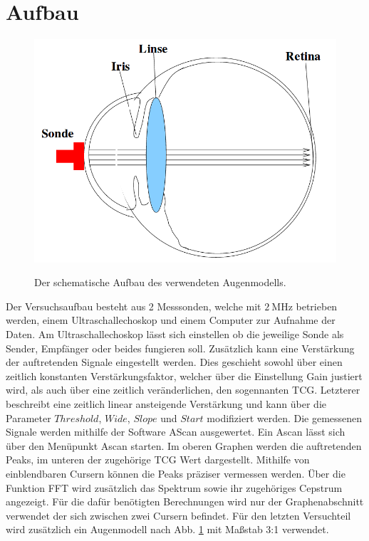 \section{Aufbau}
\label{sec:Aufbau}

\begin{figure}
 \centering
 \caption{Der schematische Aufbau des verwendeten Augenmodells.\cite{US1}}
 \includegraphics[width=\linewidth-170pt,height=\textheight-170pt,keepaspectratio]{content/AUGE.png}
 \label{fig:auge}
\end{figure}

Der Versuchsaufbau besteht aus 2 Messsonden, welche mit $\SI{2}{\mega\hertz}$
betrieben werden, einem Ultraschallechoskop und einem Computer zur Aufnahme der Daten.
Am Ultraschallechoskop lässt sich einstellen ob die jeweilige Sonde als Sender,
Empfänger oder beides fungieren soll. Zusätzlich kann eine Verstärkung der
auftretenden Signale eingestellt werden. Dies geschieht sowohl über einen zeitlich konstanten Verstärkungsfaktor,
welcher über die Einstellung Gain justiert wird, als auch über eine zeitlich
veränderlichen, den sogennanten  TCG. Letzterer beschreibt eine zeitlich linear ansteigende Verstärkung
und kann über die Parameter $Threshold$, $Wide$, $Slope$ und $Start$
modifiziert werden. Die gemessenen Signale werden mithilfe der
Software AScan ausgewertet. Ein Ascan lässt sich über den Menüpunkt Ascan starten. Im oberen
Graphen werden die auftretenden Peaks, im unteren der zugehörige TCG Wert
dargestellt. Mithilfe von einblendbaren Cursern können die Peaks präziser vermessen
werden. Über die Funktion FFT wird zusätzlich das Spektrum sowie ihr zugehöriges
Cepstrum angezeigt. Für die dafür benötigten Berechnungen wird nur der
Graphenabschnitt verwendet der sich zwischen zwei Cursern befindet.
Für den letzten Versuchteil wird zusätzlich ein Augenmodell nach Abb. \ref{fig:auge} mit Maßstab 3:1 verwendet.
